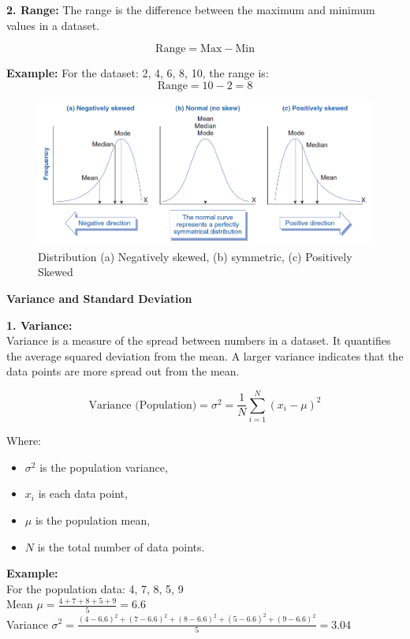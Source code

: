 \documentclass[12pt,a4paper]{book}
\begin{document}
\textbf{2. Range:}
The range is the difference between the maximum and minimum values in a dataset.

\[
\text{Range} = \text{Max} - \text{Min}
\]

\textbf{Example:}
For the dataset: 2, 4, 6, 8, 10, the range is:
\[
\text{Range} = 10 - 2 = 8
\]


\begin{figure}[h!]  %
\centering
\includegraphics[width=\textwidth]{imgs/distribution.png}
\caption{Distribution (a) Negatively skewed, (b) symmetric, (c) Positively Skewed}  
\end{figure}

\vspace{1cm}

\textbf{Variance and Standard Deviation}

\vspace{0.5cm}

\textbf{1. Variance:} \\
Variance is a measure of the spread between numbers in a dataset. It quantifies the average squared deviation from the mean. A larger variance indicates that the data points are more spread out from the mean.

\[
\text{Variance (Population)} = \sigma^2 = \frac{1}{N} \sum_{i=1}^{N} (x_i - \mu)^2
\]

Where:
\begin{itemize}
    \item \( \sigma^2 \) is the population variance,
    \item \( x_i \) is each data point,
    \item \( \mu \) is the population mean,
    \item \( N \) is the total number of data points.
\end{itemize}

\textbf{Example:} \\
For the population data: 4, 7, 8, 5, 9 \\
Mean \( \mu = \frac{4 + 7 + 8 + 5 + 9}{5} = 6.6 \) \\
Variance \( \sigma^2 = \frac{(4-6.6)^2 + (7-6.6)^2 + (8-6.6)^2 + (5-6.6)^2 + (9-6.6)^2}{5} = 3.04 \)
\end{document}
